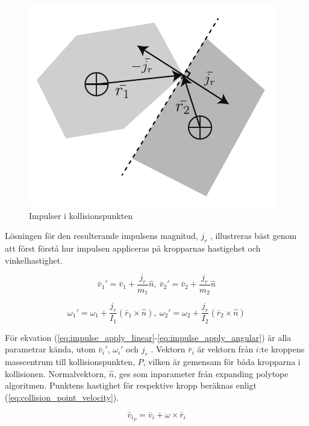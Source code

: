 \documentclass[a4paper,12pt,twopage,swedish]{article}
\begin{document}
\begin{figure}[H]
	\centering
	\includegraphics{illustrations/impulse.pdf}
	\caption{Impulser i kollisionspunkten}
	\label{fig:impulse}
\end{figure}

Lösningen för den resulterande impulsens magnitud, $j_r$ , illustreras bäst genom att först förstå hur impulsen appliceras på kropparnas hastigehet och vinkelhastighet.

\begin{equation}\label{eq:impulse_apply_linear}
\bar{v}_1' = \bar{v}_1 + \frac{j_r}{m_1}\hat{n}, \ \bar{v}_2' = \bar{v}_2 + \frac{j_r}{m_2}\hat{n}
\end{equation}

\begin{equation}\label{eq:impulse_apply_angular}
\omega_1' = \omega_1 + \frac{j_r}{I_1}(\bar{r}_1 \times \hat{n}), \ \omega_2' = \omega_2 + \frac{j_r}{I_2}(\bar{r}_2 \times \hat{n})
\end{equation}

För ekvation (\ref{eq:impulse_apply_linear}-\ref{eq:impulse_apply_angular}) är alla parametrar kända, utom $\bar{v}_i'$, $\omega_i'$ och $j_r$ . Vektorn $\bar{r}_i$ är vektorn från $i$:te kroppens masscentrum till kollisionspunkten, $P$, vilken är gemensam för båda kropparna i kollisionen. Normalvektorn, $\hat{n}$, ges som inparameter från expanding polytope algoritmen. Punktens hastighet för respektive kropp beräknas enligt (\ref{eq:collision_point_velocity}).

\begin{equation}\label{eq:collision_point_velocity}
\bar{v}_{i_P} = \bar{v}_i + \omega \times \bar{r}_i
\end{equation}
\end{document}
